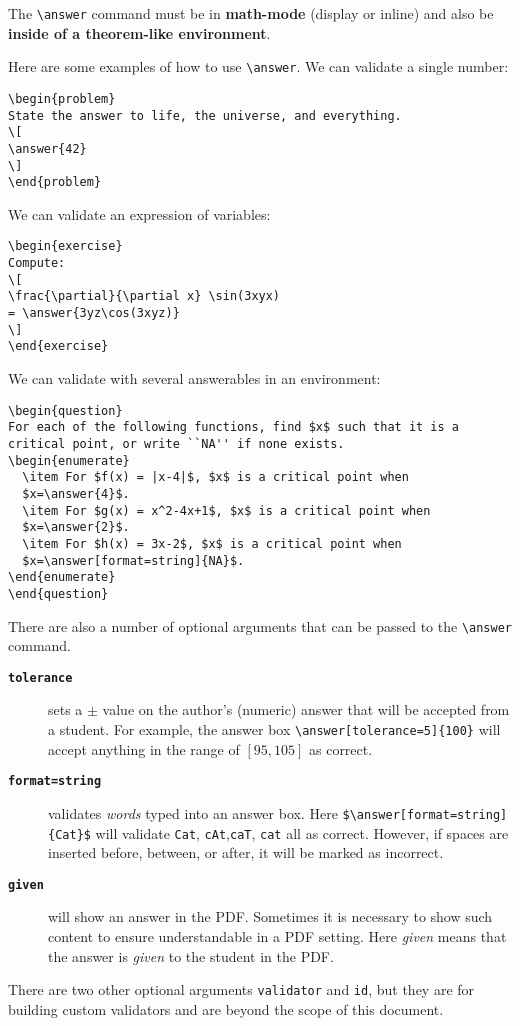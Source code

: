 \documentclass{ximera}
\begin{document}
\begin{warning}
  The \verb|\answer| command must be in \textbf{math-mode} (display or inline)
  and also be \textbf{inside of a
    theorem-like environment}.
\end{warning}
Here are some examples of how to use \verb!\answer!. We can validate a single
number:
\begin{verbatim}
\begin{problem}
State the answer to life, the universe, and everything.
\[
\answer{42}
\]
\end{problem}
\end{verbatim}
We can validate an expression of variables:
\begin{verbatim}
\begin{exercise}
Compute:
\[
\frac{\partial}{\partial x} \sin(3xyx) 
= \answer{3yz\cos(3xyz)}
\]
\end{exercise}
\end{verbatim}
We can validate with several answerables in an environment:
\begin{verbatim}
\begin{question}
For each of the following functions, find $x$ such that it is a
critical point, or write ``NA'' if none exists.
\begin{enumerate}
  \item For $f(x) = |x-4|$, $x$ is a critical point when 
  $x=\answer{4}$.
  \item For $g(x) = x^2-4x+1$, $x$ is a critical point when 
  $x=\answer{2}$.
  \item For $h(x) = 3x-2$, $x$ is a critical point when 
  $x=\answer[format=string]{NA}$.
\end{enumerate}
\end{question}
\end{verbatim}

There are also a number of optional arguments that can be passed
to the \verb|\answer| command.
\begin{description}
  \item[\tt\bfseries tolerance] sets a $\pm$ value on the
    author's (numeric) answer that will be accepted from a student. For
    example,
    the answer box \verb|\answer[tolerance=5]{100}| will accept anything in
    the range of $[95,105]$ as correct.
  \item[\tt\bfseries format=string] validates \textit{words} typed into an
    answer box. Here \verb|$\answer[format=string]{Cat}$| will validate
    \verb!Cat!,
    \verb!cAt!,\verb!caT!, \verb!cat! all as
    correct. However, if spaces are inserted before, between, or after, it will
    be marked as incorrect.
  \item[\tt\bfseries given] will show an answer in the PDF. Sometimes it is
    necessary to
    show such content to ensure
    understandable in a PDF setting. Here \textit{given} means
    that the answer is \textit{given} to the student in the PDF.
\end{description}
There are two other optional arguments \verb!validator! and \verb!id!, but they
are for building custom validators and are beyond the scope of this document.
\end{document}
